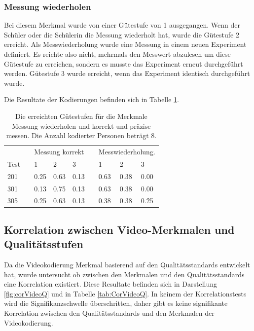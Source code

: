  \subsubsection{Messung wiederholen}
 
 Bei diesem Merkmal wurde von einer Gütestufe von 1 ausgegangen. Wenn der Schüler oder die Schülerin die Messung wiederholt hat, wurde die Gütestufe 2 erreicht. Als Messwiederholung wurde eine Messung in einem neuen Experiment definiert. Es reichte also nicht, mehrmals den Messwert abzulesen um diese Gütestufe zu erreichen, sondern es musste das Experiment erneut durchgeführt werden. Gütestufe 3 wurde erreicht, wenn das Experiment identisch durchgeführt wurde.
 
 Die Resultate der Kodierungen befinden sich in Tabelle \ref{tab:VideoMerkmale}.
 
 
 
 \begin{table}[htbp]
   \centering
 \begin{tabular}{@{}lllllllll@{}}
 \toprule
    &&\multicolumn{3}{l}{Messung korrekt} &&  \multicolumn{3}{l}{Messwiederholung.}\\ 
       \cmidrule{3-5}\cmidrule{7-9}
    Test && 1 & 2 & 3 && 1 & 2 & 3 \\ 
 \midrule
    201 && 0.25 & 0.63 & 0.13 && 0.63 & 0.38 & 0.00   \\ 
    301 && 0.13 & 0.75 & 0.13 && 0.63 & 0.38 & 0.00   \\ 
    305 && 0.25 & 0.63 & 0.13 && 0.38 & 0.38 & 0.25\\ 
 
 \bottomrule
 \end{tabular} 
   \caption{Die erreichten Gütestufen für die Merkmale Messung wiederholen und korrekt und präzise messen. Die Anzahl kodierter Personen beträgt 8.  }
   \label{tab:VideoMerkmale}
 \end{table}
 

 
 \subsection{Korrelation zwischen Video-Merkmalen und Qualitätsstufen}
 
 Da die Videokodierung Merkmal basierend auf den Qualitätsstandards entwickelt hat, wurde untersucht ob zwischen den Merkmalen und den Qualitätsstandards eine Korrelation existiert. Diese Resultate befinden sich in Darstellung \ref{fig:corVideoQ} und in Tabelle \ref{tab:CorVideoQ}. In keinem der Korrelationstests wird die Signifikanzschwelle überschritten, daher gibt es keine signifikante Korrelation zwischen den Qualitätsstandards und den Merkmalen der Videokodierung.
 
